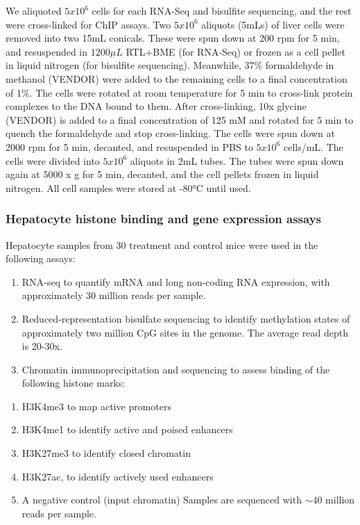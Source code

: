 \documentclass[10pt,letterpaper]{article}
\providecommand{\tightlist}{%
  \setlength{\itemsep}{0pt}\setlength{\parskip}{0pt}}
\begin{document}
We aliquoted \(5 x 10^{6}\) cells for each RNA-Seq and bisulfite
sequencing, and the rest were cross-linked for ChIP assays. Two
\(5 x 10^6\) aliquots (5mLs) of liver cells were removed into two 15mL
conicals. These were spun down at 200 rpm for 5 min, and resuspended in
\(1200\mu L\) RTL+BME (for RNA-Seq) or frozen as a cell pellet in liquid
nitrogen (for bisulfite sequencing). Meanwhile, 37\% formaldehyde in
methanol (VENDOR) were added to the remaining cells to a final
concentration of 1\%. The cells were rotated at room temperature for 5
min to cross-link protein complexes to the DNA bound to them. After
cross-linking, 10x glycine (VENDOR) is added to a final concentration of
125 mM and rotated for 5 min to quench the formaldehyde and stop
cross-linking. The cells were spun down at 2000 rpm for 5 min, decanted,
and resuspended in PBS to \(5 x 10^6\) cells/mL. The cells were divided
into \(5x10^6\) aliquots in 2mL tubes. The tubes were spun down again at
5000 x g for 5 min, decanted, and the cell pellets frozen in liquid
nitrogen. All cell samples were stored at -80°C until used.

\hypertarget{hepatocyte-histone-binding-and-gene-expression-assays}{%
\subsubsection{Hepatocyte histone binding and gene expression
assays}\label{hepatocyte-histone-binding-and-gene-expression-assays}}

Hepatocyte samples from 30 treatment and control mice were used in the
following assays:

\begin{enumerate}
\def\labelenumi{\arabic{enumi}.}
\tightlist
\item
  RNA-seq to quantify mRNA and long non-coding RNA expression, with
  approximately 30 million reads per sample.
\item
  Reduced-representation bisulfate sequencing to identify methylation
  states of approximately two million CpG sites in the genome. The
  average read depth is 20-30x.
\item
  Chromatin immunoprecipitation and sequencing to assess binding of the
  following histone marks:
\end{enumerate}

\begin{enumerate}
\def\labelenumi{\alph{enumi}.}
\tightlist
\item
  H3K4me3 to map active promoters
\item
  H3K4me1 to identify active and poised enhancers
\item
  H3K27me3 to identify closed chromatin
\item
  H3K27ac, to identify actively used enhancers
\item
  A negative control (input chromatin) Samples are sequenced with
  \(\sim40\) million reads per sample.
\end{enumerate}
\end{document}
